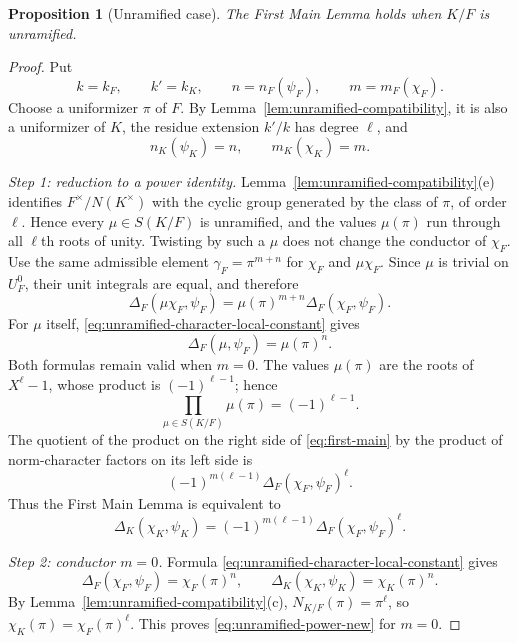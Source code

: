 \documentclass[11pt]{amsart}
\newtheorem{proposition}[theorem]{Proposition}
\theoremstyle{definition}
\theoremstyle{remark}
\begin{document}
\begin{proposition}[Unramified case]\label{prop:unramified-new}
The First Main Lemma holds when $K/F$ is unramified.
\end{proposition}

\begin{proof}
Put
\[
 k=k_F,\qquad k'=k_K,\qquad
 n=n_F(\psi_F),\qquad m=m_F(\chi_F).
\]
Choose a uniformizer $\pi$ of $F$.  By
Lemma~\ref{lem:unramified-compatibility}, it is also a uniformizer of
$K$, the residue extension $k'/k$ has degree $\ell$, and
\begin{equation}\label{eq:unramified-common-conductors}
 n_K(\psi_K)=n,\qquad m_K(\chi_K)=m.
\end{equation}

\smallskip
\noindent\emph{Step 1: reduction to a power identity.}
Lemma~\ref{lem:unramified-compatibility}(e) identifies
$F^\times/N(K^\times)$ with the cyclic group generated by the class of
$\pi$, of order $\ell$.  Hence every $\mu\in S(K/F)$ is unramified,
and the values $\mu(\pi)$ run through all $\ell$th roots of unity.
Twisting by such a $\mu$ does not change the conductor of $\chi_F$.
Use the same admissible element $\gamma_F=\pi^{m+n}$ for $\chi_F$ and
$\mu\chi_F$.  Since $\mu$ is trivial on $U_F^0$, their unit integrals
are equal, and therefore
\begin{equation}\label{eq:unramified-twist-delta}
 \Delta_F(\mu\chi_F,\psi_F)
 =\mu(\pi)^{m+n}\Delta_F(\chi_F,\psi_F).
\end{equation}
For $\mu$ itself, \eqref{eq:unramified-character-local-constant} gives
\begin{equation}\label{eq:unramified-mu-delta}
 \Delta_F(\mu,\psi_F)=\mu(\pi)^n.
\end{equation}
Both formulas remain valid when $m=0$.  The values $\mu(\pi)$ are
the roots of $X^\ell-1$, whose product is $(-1)^{\ell-1}$; hence
\[
 \prod_{\mu\in S(K/F)}\mu(\pi)=(-1)^{\ell-1}.
\]
The quotient of the product on the right side of
\eqref{eq:first-main} by the product of norm-character factors on its
left side is
\[
 (-1)^{m(\ell-1)}\Delta_F(\chi_F,\psi_F)^\ell.
\]
Thus the First Main Lemma is equivalent to
\begin{equation}\label{eq:unramified-power-new}
 \Delta_K(\chi_K,\psi_K)=
 (-1)^{m(\ell-1)}\Delta_F(\chi_F,\psi_F)^\ell.
\end{equation}

\smallskip
\noindent\emph{Step 2: conductor $m=0$.}
Formula \eqref{eq:unramified-character-local-constant} gives
\[
 \Delta_F(\chi_F,\psi_F)=\chi_F(\pi)^n,
 \qquad
 \Delta_K(\chi_K,\psi_K)=\chi_K(\pi)^n.
\]
By Lemma~\ref{lem:unramified-compatibility}(c),
$N_{K/F}(\pi)=\pi^\ell$, so
$\chi_K(\pi)=\chi_F(\pi)^\ell$.  This proves
\eqref{eq:unramified-power-new} for $m=0$.


\end{proof}
\end{document}
